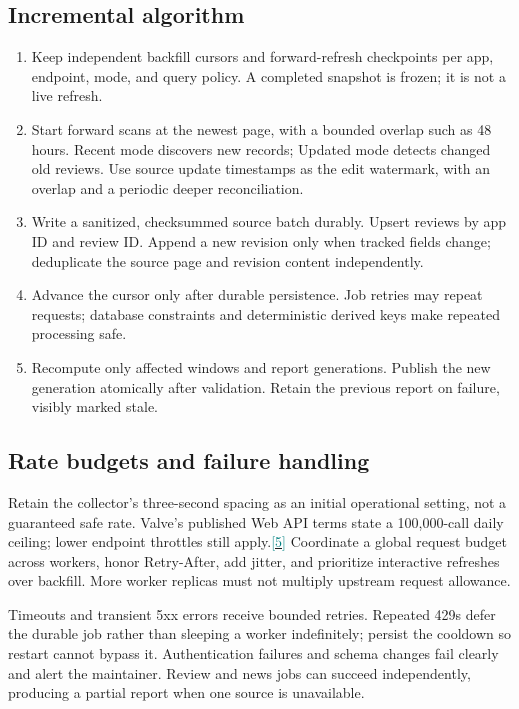 \documentclass[10pt,letterpaper]{article}
\newcommand{\sr}[1]{\hyperlink{src#1}{\textcolor{teal}{[#1]}}}
\begin{document}
\subsection{Incremental algorithm}
\begin{enumerate}
\item Keep independent backfill cursors and forward-refresh checkpoints per app, endpoint, mode, and query policy. A completed snapshot is frozen; it is not a live refresh.
\item Start forward scans at the newest page, with a bounded overlap such as 48 hours. Recent mode discovers new records; Updated mode detects changed old reviews. Use source update timestamps as the edit watermark, with an overlap and a periodic deeper reconciliation.
\item Write a sanitized, checksummed source batch durably. Upsert reviews by app ID and review ID. Append a new revision only when tracked fields change; deduplicate the source page and revision content independently.
\item Advance the cursor only after durable persistence. Job retries may repeat requests; database constraints and deterministic derived keys make repeated processing safe.
\item Recompute only affected windows and report generations. Publish the new generation atomically after validation. Retain the previous report on failure, visibly marked stale.
\end{enumerate}

\subsection{Rate budgets and failure handling}
Retain the collector's three-second spacing as an initial operational setting, not a guaranteed safe rate. Valve's published Web API terms state a 100,000-call daily ceiling; lower endpoint throttles still apply.\sr{5} Coordinate a global request budget across workers, honor Retry-After, add jitter, and prioritize interactive refreshes over backfill. More worker replicas must not multiply upstream request allowance.

Timeouts and transient 5xx errors receive bounded retries. Repeated 429s defer the durable job rather than sleeping a worker indefinitely; persist the cooldown so restart cannot bypass it. Authentication failures and schema changes fail clearly and alert the maintainer. Review and news jobs can succeed independently, producing a partial report when one source is unavailable.
\end{document}
